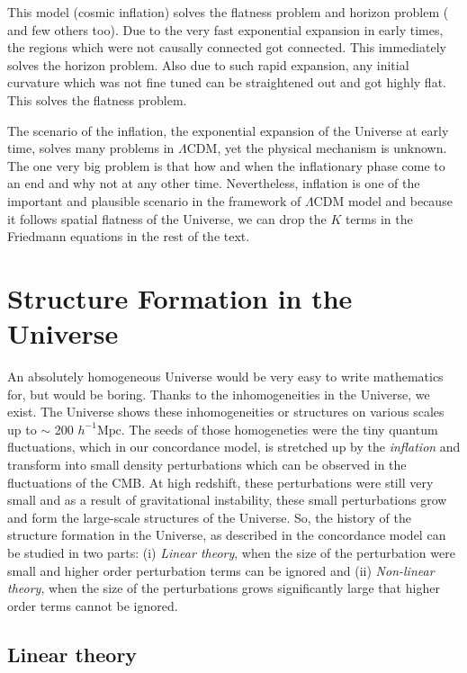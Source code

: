 This model (cosmic inflation) solves the flatness problem and horizon problem (
and few others too). Due to the very fast exponential expansion in early times, the
regions which were not causally connected got connected. This immediately solves
the horizon problem. Also due to such rapid expansion, any initial curvature which
was not fine tuned can be straightened out and got highly flat. This solves the
flatness problem. 

The scenario of the inflation, the exponential expansion of the Universe at 
early time, solves many problems in $\Lambda$CDM, yet the physical mechanism
is unknown. The one very big problem is that how and when the inflationary phase come
to an end and why not at any other time. Nevertheless, inflation is one of the
important and plausible scenario in the framework of $\Lambda$CDM model and because
it follows spatial flatness  of the Universe, we can drop the $K$ terms in the Friedmann
equations in the rest of the text.

\section{Structure Formation in the Universe}

An absolutely homogeneous Universe would be very easy to write mathematics for, but 
would be boring. Thanks to the inhomogeneities in the Universe, we exist. The Universe
shows these inhomogeneities or structures on various scales up to $\sim$ 
200 $h^{-1} \mathrm{Mpc}$. The seeds
of those homogeneties were the tiny quantum fluctuations, which in our concordance 
model, is stretched up by the {\it inflation} and transform into small density
perturbations which can be observed in the  fluctuations of the CMB. 
At high redshift, these perturbations were still very small and as 
a result of gravitational instability, these small perturbations 
grow and form the large-scale structures of the Universe. 
So, the history of the  structure formation in the Universe, as described in the 
concordance model can be studied in two parts: (i) {\it Linear theory}, when
the size of the perturbation were small and higher order perturbation terms can be ignored and 
(ii) {\it Non-linear theory}, when the size of the perturbations grows significantly
large that higher order terms cannot be ignored.

\subsection{Linear theory}

